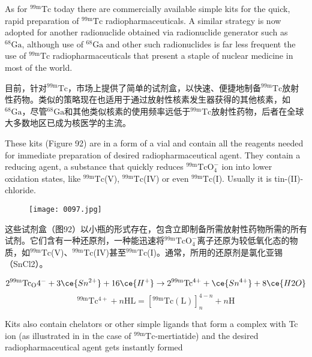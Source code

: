 \documentclass[dvipsnames, svgnames,a4paper,11pt]{article}
\begin{document}
As for ${}^\mathrm{99m}\mathrm{Tc}$ today there are commercially available simple kits for the quick, rapid
preparation of ${}^\mathrm{99m}\mathrm{Tc}$ radiopharmaceuticals. A similar strategy is now adopted for
another radionuclide obtained via radionuclide generator such as ${}^{68}\mathrm{Ga}$, although use
of ${}^{68}\mathrm{Ga}$ and other such radionuclides is far less frequent the use of ${}^\mathrm{99m}\mathrm{Tc}$
radiopharmaceuticals that present a staple of nuclear medicine in most of the world.

目前，针对${}^\mathrm{99m}\mathrm{Tc}$，市场上提供了简单的试剂盒，以快速、便捷地制备${}^\mathrm{99m}\mathrm{Tc}$放射性药物。类似的策略现在也适用于通过放射性核素发生器获得的其他核素，如${}^{68}\mathrm{Ga}$，尽管${}^{68}\mathrm{Ga}$和其他类似核素的使用频率远低于${}^\mathrm{99m}\mathrm{Tc}$放射性药物，后者在全球大多数地区已成为核医学的主流。



These kits (Figure 92) are in a form of a vial and contain all the reagents needed for
immediate preparation of desired radiopharmaceutical agent. They contain a
reducing agent, a substance that quickly reduces ${}^\mathrm{99m}\mathrm{TcO_4^-}$ ion into lower oxidation
states, like ${}^\mathrm{99m}\mathrm{Tc}$(V), ${}^\mathrm{99m}\mathrm{Tc}$(IV) or even ${}^\mathrm{99m}\mathrm{Tc}$(I). Usually it is tin-(II)-chloride.

\begin{figure}[h]
    \centering
    \texttt{[image: 0097.jpg]}
     \label{fig92}
\end{figure}

这些试剂盒（图92）以小瓶的形式存在，包含立即制备所需放射性药物所需的所有试剂。它们含有一种还原剂，一种能迅速将${}^\mathrm{99m}\mathrm{TcO_4^-}$离子还原为较低氧化态的物质，如${}^\mathrm{99m}\mathrm{Tc}$(V)、${}^\mathrm{99m}\mathrm{Tc}$(IV)甚至${}^\mathrm{99m}\mathrm{Tc}$(I)。通常，所用的还原剂是氯化亚锡（SnCl2）。

\[
\mathrm{2^{99m}Tc_O4^-} + 3\ce{Sn^{2+}} + 16\ce{H^+} \rightarrow \mathrm{2^{99m}Tc^{4+}} + \ce{Sn^{4+}} + 8\ce{H2O}
\]
\[
\mathrm{^{99m}Tc^{4+}} + n\mathrm{HL} = [\mathrm{^{99m}Tc(L)}]_n^{4-n} + n\mathrm{H}
\]

Kits also contain chelators or other simple ligands that form a complex with Tc ion
(as illustrated in in the case of ${}^\mathrm{99m}\mathrm{Tc}$-mertiatide) and the desired radiopharmaceutical
agent gets instantly formed
\end{document}
